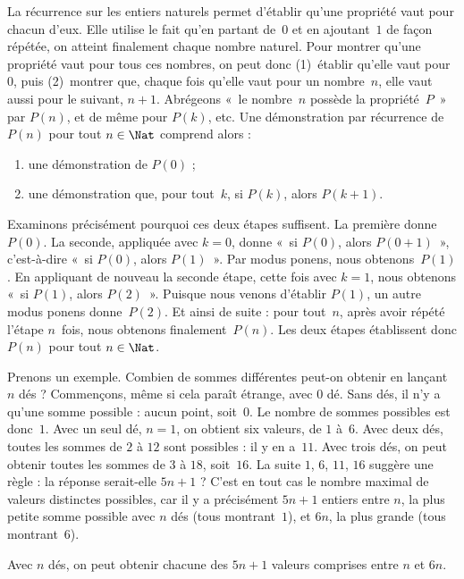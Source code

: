 \documentclass[../../../include/open-logic-section]{subfiles}
\begin{document}


La récurrence sur les entiers naturels permet d'établir
qu'une propriété vaut pour chacun d'eux. Elle utilise
le fait qu'en partant de~$0$
et en ajoutant~$1$ de façon
répétée, on atteint finalement
chaque nombre naturel.
Pour montrer qu'une propriété
vaut pour tous ces nombres,
on peut donc
(1)~établir qu'elle vaut
pour~$0$, puis
(2)~montrer que, chaque fois
qu'elle vaut pour un nombre~$n$,
elle vaut aussi pour le
suivant, $n+1$.
Abrégeons «~le nombre~$n$
possède la propriété~$P$~»
par $P(n)$, et de même
pour $P(k)$, etc.
Une démonstration par
récurrence de $P(n)$
pour tout $n \in \Nat$
comprend alors :
\begin{enumerate}
\item une démonstration de $P(0)$ ;
\item une démonstration que,
  pour tout~$k$, si $P(k)$,
  alors $P(k+1)$.
\end{enumerate}
Examinons précisément pourquoi
ces deux étapes suffisent.
La première donne~$P(0)$.
La seconde, appliquée avec
$k=0$, donne
«~si $P(0)$, alors $P(0+1)$~»,
c'est-à-dire
«~si $P(0)$, alors $P(1)$~».
Par modus ponens, nous
obtenons~$P(1)$.
En appliquant de nouveau
la seconde étape, cette
fois avec $k=1$,
nous obtenons
«~si $P(1)$, alors $P(2)$~».
Puisque nous venons
d'établir $P(1)$,
un autre modus ponens
donne~$P(2)$.
Et ainsi de suite :
pour tout~$n$, après
avoir répété l'étape
$n$~fois, nous obtenons
finalement~$P(n)$.
Les deux étapes établissent
donc $P(n)$ pour tout
$n \in \Nat$.

Prenons un exemple.
Combien de sommes différentes
peut-on obtenir en lançant
$n$ dés ? Commençons,
même si cela paraît étrange,
avec $0$ dé. Sans dés,
il n'y a qu'une somme
possible : aucun point,
soit~$0$. Le nombre
de sommes possibles est
donc~$1$. Avec un seul
dé, $n=1$, on obtient
six valeurs, de $1$ à~$6$.
Avec deux dés, toutes
les sommes de $2$ à
$12$ sont possibles :
il y en a~$11$.
Avec trois dés, on
peut obtenir toutes
les sommes de $3$
à $18$, soit~$16$.
La suite $1$, $6$,
$11$, $16$ suggère
une règle : la réponse
serait-elle $5n+1$ ?
C'est en tout cas le
nombre maximal de
valeurs distinctes
possibles, car il y
a précisément $5n+1$
entiers entre $n$,
la plus petite somme
possible avec $n$
dés (tous montrant~$1$),
et $6n$, la plus
grande (tous
montrant~$6$).

\begin{thm}
  Avec $n$ dés, on peut
  obtenir chacune des
  $5n+1$ valeurs
  comprises entre
  $n$ et $6n$.
\end{thm}
\end{document}
